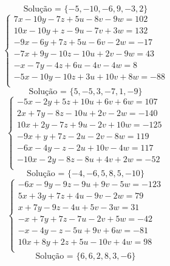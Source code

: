 \documentclass[12pt,oneside,a4paper]{article}
\begin{document}
\begin{equation*}
\text{Solução = }\{-5,-10,-6,9,-3,2\}
\end{equation*}
\vspace{\baselineskip}
\begin{equation*}
\begin{cases}
7x-10y-7z+5u-8v-9w=102 \\
10x-10y+z-9u-7v+3w=132 \\
-9x-6y+7z+5u-6v-2w=-17 \\
-7x+9y-10z-10u+2v-9w=43 \\
-x-7y-4z+6u-4v-4w=8 \\
-5x-10y-10z+3u+10v+8w=-88 \\
\end{cases}
\end{equation*}
\begin{equation*}
\text{Solução = }\{5,-5,3,-7,1,-9\}
\end{equation*}
\vspace{\baselineskip}
\begin{equation*}
\begin{cases}
-5x-2y+5z+10u+6v+6w=107 \\
2x+7y-8z-10u+2v-2w=-140 \\
10x+2y-7z+9u-2v+10w=-125 \\
-9x+y+7z-2u-2v-8w=119 \\
-6x-4y-z-2u+10v-4w=117 \\
-10x-2y-8z-8u+4v+2w=-52 \\
\end{cases}
\end{equation*}
\begin{equation*}
\text{Solução = }\{-4,-6,5,8,5,-10\}
\end{equation*}
\vspace{\baselineskip}
\begin{equation*}
\begin{cases}
-6x-9y-9z-9u+9v-5w=-123 \\
5x+3y+7z+4u-9v-2w=79 \\
x+7y-9z-4u+5v-3w=31 \\
-x+7y+7z-7u-2v+5w=-42 \\
-x-4y-z-5u+9v+6w=-81 \\
10x+8y+2z+5u-10v+4w=98 \\
\end{cases}
\end{equation*}
\begin{equation*}
\text{Solução = }\{6,6,2,8,3,-6\}
\end{equation*}
\end{document}
